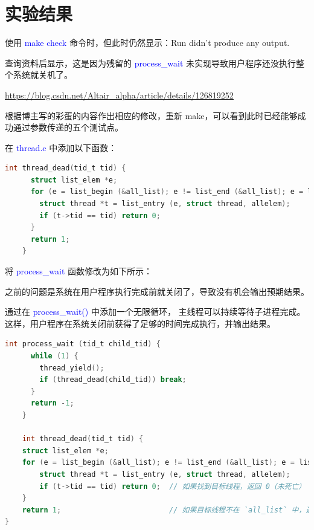 \documentclass[14pt,a4paper,UTF8,twoside]{article}
\renewcommand{\texttt}[1]{\textcolor{blue}{\ttfamily #1}}
\begin{document}
\section{实验结果}

\begin{rmr}

使用 \texttt{make check} 命令时，但此时仍然显示：Run didn’t produce any output.

查询资料后显示，这是因为残留的 \texttt{process\_wait} 未实现导致用户程序还没执行整个系统就关机了。

\href{https://blog.csdn.net/Altair_alpha/article/details/126819252}{\underline{https://blog.csdn.net/Altair\_alpha/article/details/126819252}}

\end{rmr}

根据博主写的彩蛋的内容作出相应的修改，重新 make，可以看到此时已经能够成功通过参数传递的五个测试点。

在 \texttt{thread.c} 中添加以下函数：

\begin{lstlisting}[language=C]
    int thread_dead(tid_t tid) {
      struct list_elem *e;
      for (e = list_begin (&all_list); e != list_end (&all_list); e = list_next (e)) {
        struct thread *t = list_entry (e, struct thread, allelem);
        if (t->tid == tid) return 0;
      }
      return 1;
    }
\end{lstlisting}

将 \texttt{process\_wait} 函数修改为如下所示：

\begin{ctt}
    之前的问题是系统在用户程序执行完成前就关闭了，导致没有机会输出预期结果。

    \vspace{0.5cm}

    通过在 \texttt{process\_wait()} 中添加一个无限循环，
    主线程可以持续等待子进程完成。
    这样，用户程序在系统关闭前获得了足够的时间完成执行，并输出结果。
\end{ctt}

\begin{lstlisting}[language=C]
    int process_wait (tid_t child_tid) {
      while (1) {
        thread_yield();
        if (thread_dead(child_tid)) break;
      }
      return -1;
    }

    int thread_dead(tid_t tid) {
    struct list_elem *e;
    for (e = list_begin (&all_list); e != list_end (&all_list); e = list_next (e)) {
        struct thread *t = list_entry (e, struct thread, allelem);
        if (t->tid == tid) return 0;  // 如果找到目标线程，返回 0（未死亡）
    }
    return 1;                         // 如果目标线程不在 `all_list` 中，返回 1（已死亡）
}
\end{lstlisting}
\end{document}
